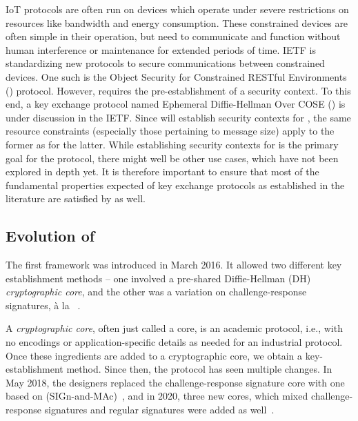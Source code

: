 IoT protocols are often run on devices which operate under severe restrictions
on resources like bandwidth and energy consumption.
%
These constrained devices are often simple in their operation, but need to
communicate and function without human interference or maintenance for
extended periods of time.
%
IETF is standardizing new protocols to secure communications between
constrained devices.
%
One such is the Object Security for Constrained RESTful Environments
(\mOscore{}) protocol.
%
However, \mOscore{} requires the pre-establishment of a security context.
%
To this end, a key exchange protocol named Ephemeral Diffie-Hellman Over
COSE
(\mEdhoc{}) is under discussion in the IETF.
%
Since \mEdhoc{} will establish security contexts for \mOscore{}, the same
resource constraints (especially those pertaining to message size) apply to the
former as for the latter.
%
While establishing security contexts for \mOscore{} is the primary goal for the
\mEdhoc{} protocol, there might well be other use cases, which have not been
explored in depth yet.
%
It is therefore important to ensure that most of the fundamental properties
expected of key exchange protocols as established in the literature are satisfied
by \mEdhoc{} as well.
%

\subsection{Evolution of \mEdhoc}
\label{sec:edhocevol}
The first \mEdhoc{} framework was introduced in March 2016.
%
It allowed two different key establishment methods -- one involved a pre-shared
Diffie-Hellman (DH) \emph{cryptographic core}, and the other was a
variation on challenge-response signatures, {\`a} la
\mOptls{}~\cite{DBLP:conf/eurosp/KrawczykW16}.

%
A \emph{cryptographic core}, often just called a core, is an academic protocol,
i.e., with no encodings or application-specific details as needed for an
industrial protocol.
%
Once these ingredients are added to a cryptographic core, we obtain a
key-establishment method.
%
Since then, the protocol has seen multiple changes.
%
In May 2018, the designers replaced the challenge-response signature core with
one based on \mSigma{}
(SIGn-and-MAc)~\cite{sigma,bruni-analysis-selander-ace-cose-ecdhe-08}, and
in
2020, three new cores, which mixed challenge-response signatures and regular
signatures were added as well~\cite{our-analysis-selander-lake-edhoc-00}.

